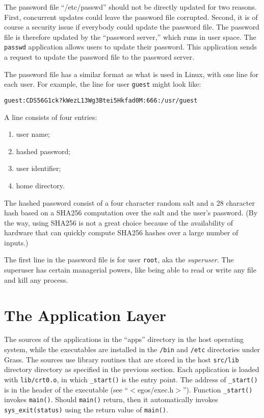 \documentclass{article}
\begin{document}
The password file ``/etc/passwd'' should not be directly updated for
two reasons.  First, concurrent updates could leave the password file
corrupted.  Second, it is of course a security issue if everybody could
update the password file.  The password file is therefore updated by
the ``password server,'' which runs in user space.  The \texttt{passwd}
application allows users to update their password.  This application
sends a request to update the password file to the password server.

The password file has a similar format as what is used in Linux, with
one line for each user.
For example, the line for user \texttt{guest} might look like:

\begin{verbatim}
guest:CDS56G1ck?kWezL13Wg3Btei5Hkfad0M:666:/usr/guest
\end{verbatim}

A line consists of four entries:
\begin{enumerate}
\item user name;
\item hashed password;
\item user identifier;
\item home directory.
\end{enumerate}

The hashed password consist of a four character random salt and a 28 character
hash based on a SHA256 computation over the salt and the user's password.
(By the way, using SHA256 is not a great choice because of the availability
of hardware that can quickly compute SHA256 hashes over a large number of
inputs.)

The first line in the password file is for user \texttt{root}, aka the
\emph{superuser}.  The superuser has certain managerial powers, like being
able to read or write any file and kill any process.

\section{The Application Layer}

The sources of the applications in the ``apps'' directory in the host
operating system, while the executables are installed in the \texttt{/bin}
and \texttt{/etc} directories under Grass.  The sources use library
routines that are stored in the host \texttt{src/lib} directory
directory as specified in the previous section.
Each application is loaded with \texttt{lib/crt0.o}, in which \texttt{\_start()}
is the entry point.  The address of \texttt{\_start()} is in the header
of the executable (see ``$<$egos/exec.h$>$'').  Function \texttt{\_start()}
invokes \texttt{main()}.  Should \texttt{main()} return, then it
automatically invokes \texttt{sys\_exit(status)} using the return value
of \texttt{main()}.
\end{document}
